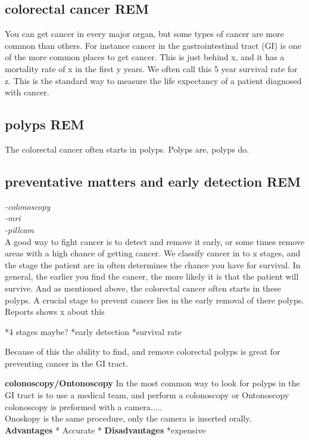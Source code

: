 	
	\vspace{10px}
	\subsection{colorectal cancer REM}
	You can get cancer in every major organ, but some types of cancer are more common than others.
	For instance cancer in the gastrointestinal tract (GI) is one of the more common places 
	to get cancer. This is just behind x, and it has a mortality rate of x in the first y years. %
	We often call this 5 year survival rate for z. This is the standard way to measure the life expectancy of a patient diagnosed with cancer. 
	
	
	\vspace{10px}
	\subsection{polyps REM}
	The colorectal cancer often starts in polyps. 
	Polyps are, polyps do.\\
	
	\vspace{10px}
	\subsection{preventative matters and early detection REM}
	\textit{-colonoscopy\\ 
		-mri\\
		-pillcam\\}
	A good way to fight cancer is to detect and remove it early, or some times remove areas with a high chance of getting cancer.
	We classify cancer in to x stages, and the stage the patient are in often determines the chance you have for survival. 
	In general, the earlier you find the cancer, the more likely it is that the patient will survive. 
	And as mentioned above, the colorectal cancer often starts in these polyps. A crucial stage to prevent cancer lies in the 
	early removal of there polyps.
	Reports shows x about this %
	
	*4 stages maybe?
	*early detection
	*survival rate
	
		
	Because of this the ability to find, and remove colorectal polyps is great for preventing cancer in the GI tract. 
	
	
	\vspace{10px}
	\textbf{colonoscopy/Ontonoscopy}
	In the most common way to look for polyps in the GI tract is to use a medical team, and perform a colonoscopy or Ontonoscopy
	colonoscopy is preformed with a camera.....\\
	Onoskopy is the same procedure, only the camera is inserted orally. \\
	\textbf{Advantages}
	  * Accurate 
	  *
	\vspace{10px}
	\textbf{Disadvantages}
	  *expensive 
	
